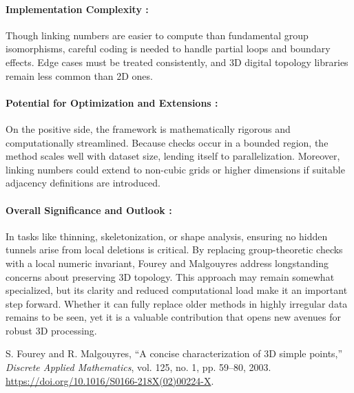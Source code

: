 \documentclass{llncs}
\begin{document}
\paragraph{Implementation Complexity :}
Though linking numbers are easier to compute than fundamental group isomorphisms, careful coding is needed to handle partial loops and boundary effects. Edge cases must be treated consistently, and 3D digital topology libraries remain less common than 2D ones.

\paragraph{Potential for Optimization and Extensions :}
On the positive side, the framework is mathematically rigorous and computationally streamlined. Because checks occur in a bounded region, the method scales well with dataset size, lending itself to parallelization. Moreover, linking numbers could extend to non-cubic grids or higher dimensions if suitable adjacency definitions are introduced.

\paragraph{Overall Significance and Outlook :}
In tasks like thinning, skeletonization, or shape analysis, ensuring no hidden tunnels arise from local deletions is critical. By replacing group-theoretic checks with a local numeric invariant, Fourey and Malgouyres address longstanding concerns about preserving 3D topology. This approach may remain somewhat specialized, but its clarity and reduced computational load make it an important step forward. Whether it can fully replace older methods in highly irregular data remains to be seen, yet it is a valuable contribution that opens new avenues for robust 3D processing. 

\begin{thebibliography}{1}

S. Fourey and R. Malgouyres, 
``A concise characterization of 3D simple points,'' 
\textit{Discrete Applied Mathematics}, 
vol. 125, no. 1, pp. 59--80, 2003. 
\url{https://doi.org/10.1016/S0166-218X(02)00224-X}.

\end{thebibliography}
\end{document}
